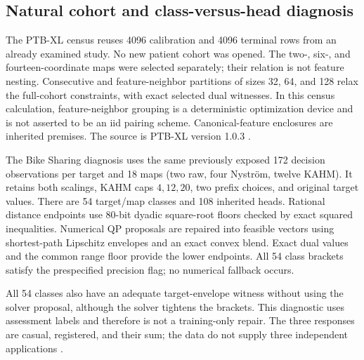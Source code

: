 \subsection{Natural cohort and class-versus-head diagnosis}
The PTB-XL census reuses 4096 calibration and 4096 terminal rows from an already examined study. No new patient cohort was opened. The two-, six-, and fourteen-coordinate maps were selected separately; their relation is not feature nesting. Consecutive and feature-neighbor partitions of sizes 32, 64, and 128 relax the full-cohort constraints, with exact selected dual witnesses. In this census calculation, feature-neighbor grouping is a deterministic optimization device and is not asserted to be an iid pairing scheme. Canonical-feature enclosures are inherited premises. The source is PTB-XL version 1.0.3 \citep{wagner2020ptbxl,wagner2022ptbxl103}.

The Bike Sharing diagnosis uses the same previously exposed 172 decision observations per target and 18 maps (two raw, four Nystr\"om, twelve KAHM). It retains both scalings, KAHM caps $4,12,20$, two prefix choices, and original target values. There are 54 target/map classes and 108 inherited heads. Rational distance endpoints use 80-bit dyadic square-root floors checked by exact squared inequalities. Numerical QP proposals are repaired into feasible vectors using shortest-path Lipschitz envelopes and an exact convex blend. Exact dual values and the common range floor provide the lower endpoints. All 54 class brackets satisfy the prespecified precision flag; no numerical fallback occurs.

All 54 classes also have an adequate target-envelope witness without using the solver proposal, although the solver tightens the brackets. This diagnostic uses assessment labels and therefore is not a training-only repair. The three responses are casual, registered, and their sum; the data do not supply three independent applications \citep{fanaee2013bike}.

